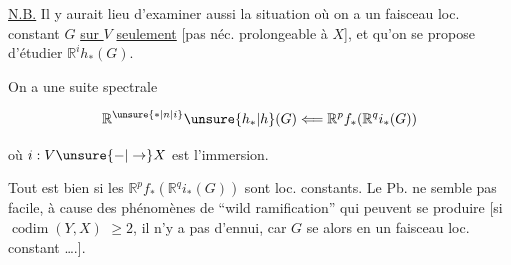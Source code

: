 
\uline{N.B.} Il y aurait lieu d'examiner aussi la situation où
on a un faisceau loc. constant
$G$ \uline{sur $V$} \uline{seulement} [pas néc.
prolongeable à $X$],  et qu'on
se propose d'étudier  $\mathbb R^i h_*(G)$.

On a une suite  spectrale

\[ \mathbb R^{\unsure{*|n|i}}\unsure{h_*|h}(G)\Longleftarrow \mathbb R^p f_*(\mathbb R^q i_*(G)) \]

où $i:V\unsure{-|\to}X$ est l'immersion.

Tout est bien si les $\mathbb R^p f_*(\mathbb R^q i_*(G))$
sont loc. constants. Le Pb. ne
semble pas facile,  à cause des
phénomènes de ``wild ramification''
qui peuvent se produire [si $\operatorname{codim}(Y,X)$
$\geq 2$, il n'y a pas d'ennui, car $G$
se  alors en un faisceau
loc. constant \ldots\thinspace.]. 

